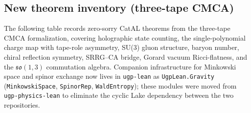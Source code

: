 \documentclass[11pt,a4paper]{article}
\theoremstyle{definition}
\begin{document}
\subsection{New theorem inventory (three-tape CMCA)}\label{subsec:new-theorem-inventory-079}

The following table records zero-sorry CatAL theorems from the three-tape CMCA
formalization, covering holographic state counting, the single-polynomial
charge map with tape-role asymmetry, SU(3) gluon structure, baryon number, chiral
reflection symmetry, SRRG--CA bridge, Gorard vacuum Ricci-flatness, and the
$\mathfrak{so}(1,3)$ commutation algebra.  Companion infrastructure for Minkowski
space and spinor exchange now lives in \texttt{ugp-lean} as
\lstinline|UgpLean.Gravity| (\lstinline|MinkowskiSpace|, \lstinline|SpinorRep|,
\lstinline|WaldEntropy|); these modules were moved from \texttt{ugp-physics-lean}
to eliminate the cyclic Lake dependency between the two repositories.
\end{document}
